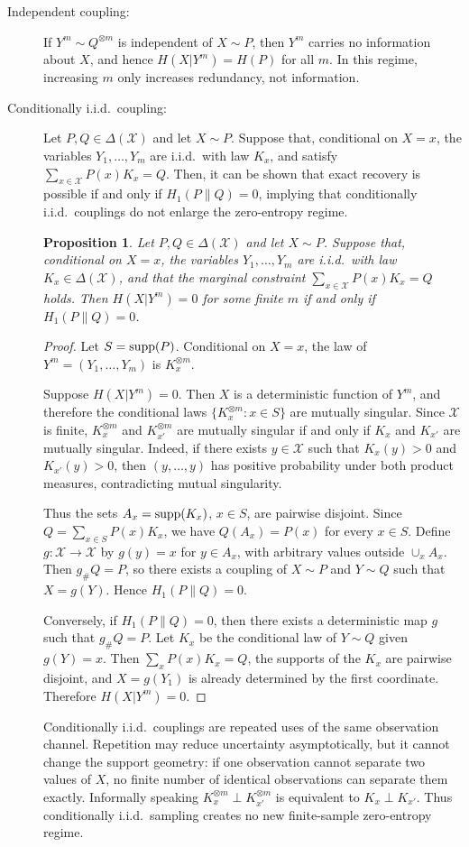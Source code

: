 \documentclass[journal]{IEEEtran}
\newtheorem{proposition}{Proposition}
\def\supp{\mathop{\rm supp}}
\def\calX{{\mathcal X}}
\newcommand{\1}{\mathbf{1}}
\begin{document}
\begin{description}
    \item[Independent coupling:] If $Y^m\sim Q^{\otimes m}$ is independent of $X\sim P$, then $Y^m$ carries no information about $X$, and hence $H(X| Y^m)=H(P)$ for all $m$. In this regime, increasing $m$ only increases redundancy, not information.
    \item[Conditionally i.i.d.\ coupling:] Let $P,Q\in\Delta(\calX)$ and let $X\sim P$. Suppose that, conditional on $X=x$, the variables $Y_1,\dots,Y_m$ are i.i.d.\ with law $K_x$, and satisfy $\sum_{x\in\calX} P(x)K_x = Q.$
Then, it can be shown that  exact recovery is possible if and only if $H_1(P\|Q)=0$, implying that conditionally i.i.d.\ couplings do not enlarge the zero-entropy regime. 


\begin{proposition}
Let $P,Q\in\Delta(\calX)$ and let $X\sim P$. Suppose that, conditional on $X=x$, the variables $Y_1,\dots,Y_m$ are i.i.d.\ with law $K_x\in\Delta(\calX)$, and that the marginal constraint $\sum_{x\in\calX}P(x)K_x=Q$ holds. Then $H(X|Y^m)=0$ for some finite $m$ if and only if $H_1(P\|Q)=0$.
\end{proposition}

\begin{proof}
Let $S=\supp(P)$. Conditional on $X=x$, the law of $Y^m=(Y_1,\dots,Y_m)$ is $K_x^{\otimes m}$.

Suppose $H(X| Y^m)=0$. Then $X$ is a deterministic function of $Y^m$, and therefore the conditional laws $\{K_x^{\otimes m}:x\in S\}$ are mutually singular. Since $\calX$ is finite, $K_x^{\otimes m}$ and $K_{x'}^{\otimes m}$ are mutually singular if and only if $K_x$ and $K_{x'}$ are mutually singular. Indeed, if there exists $y\in\calX$ such that $K_x(y)>0$ and $K_{x'}(y)>0$, then $(y,\dots,y)$ has positive probability under both product measures, contradicting mutual singularity.

Thus the sets $A_x=\supp(K_x)$, $x\in S$, are pairwise disjoint. Since $Q=\sum_{x\in S}P(x)K_x$, we have $Q(A_x)=P(x)$ for every $x\in S$. Define $g:\calX\to\calX$ by $g(y)=x$ for $y\in A_x$, with arbitrary values outside $\cup_x A_x$. Then $g_\# Q=P$, so there exists a coupling of $X\sim P$ and $Y\sim Q$ such that $X=g(Y)$. Hence $H_1(P\|Q)=0$.

Conversely, if $H_1(P\|Q)=0$, then there exists a deterministic map $g$ such that $g_\#Q=P$. Let $K_x$ be the conditional law of $Y\sim Q$ given $g(Y)=x$. Then $\sum_xP(x)K_x=Q$, the supports of the $K_x$ are pairwise disjoint, and $X=g(Y_1)$ is already determined by the first coordinate. Therefore $H(X| Y^m)=0$.
\end{proof}
Conditionally i.i.d.\ couplings are repeated uses of the same observation
channel. Repetition may reduce uncertainty asymptotically, but it cannot
change the support geometry: if one observation cannot separate two values of
$X$, no finite number of identical observations can separate them exactly. Informally speaking $K_x^{\otimes m} \perp K_{x'}^{\otimes m}$ is equivalent to  $K_x \perp K_{x'}.$
Thus conditionally i.i.d.\ sampling creates no new finite-sample zero-entropy
regime.



\end{description}
\end{document}

